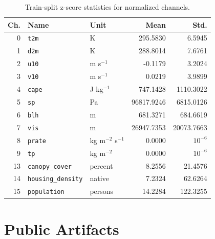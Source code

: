 \documentclass[11pt]{article}
\begin{document}
\begin{table}[h]
\centering
\small
\caption{Train-split z-score statistics for normalized channels.}
\label{tab:normalization}
\begin{tabular}{rllrr}
\toprule
Ch. & Name & Unit & Mean & Std. \\
\midrule
0 & \texttt{t2m} & K & 295.5830 & 6.5945 \\
1 & \texttt{d2m} & K & 288.8014 & 7.6761 \\
2 & \texttt{u10} & m s\(^{-1}\) & -0.1179 & 3.2024 \\
3 & \texttt{v10} & m s\(^{-1}\) & 0.0219 & 3.9899 \\
4 & \texttt{cape} & J kg\(^{-1}\) & 747.1428 & 1110.3022 \\
5 & \texttt{sp} & Pa & 96817.9246 & 6815.0126 \\
6 & \texttt{blh} & m & 681.3271 & 684.6619 \\
7 & \texttt{vis} & m & 26947.7353 & 20073.7663 \\
8 & \texttt{prate} & kg m\(^{-2}\) s\(^{-1}\) & 0.0000 & \(10^{-6}\) \\
9 & \texttt{tp} & kg m\(^{-2}\) & 0.0000 & \(10^{-6}\) \\
13 & \texttt{canopy\_cover} & percent & 8.2556 & 21.4576 \\
14 & \texttt{housing\_density} & native & 7.2324 & 62.6264 \\
15 & \texttt{population} & persons & 14.2284 & 122.3255 \\
\bottomrule
\end{tabular}
\end{table}

\section{Public Artifacts}
\label{app:artifacts}
\end{document}
